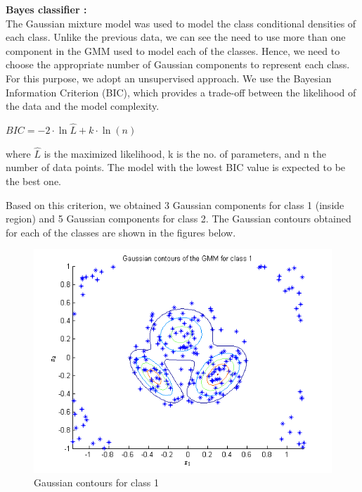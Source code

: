 \documentclass{article}
\begin{document}
\begin{flushleft}

\textbf{Bayes classifier :}  \\[10pt]
The Gaussian mixture model was used to model the class conditional densities of each class. Unlike the previous data, we can see the need to use more than one component in the GMM used to model each of the classes. Hence, we need to choose the appropriate number of Gaussian components to represent each class.
\\[10pt]

For this purpose, we adopt an unsupervised approach. We use the Bayesian Information Criterion (BIC), which provides a trade-off between the likelihood of the data and the model complexity.

 $BIC = -2 \cdot \ln\hat L + k \cdot \ln(n)$  


where $\hat L$ is the maximized likelihood, k is the no. of parameters, and n the number of data points. The model with the lowest BIC value is expected to be the best one.


Based on this criterion, we obtained 3 Gaussian components for class 1 (inside region) and 5 Gaussian components for class 2. The Gaussian contours obtained for each of the classes are shown in the figures below.



\end{flushleft}


\begin{figure}[H]
\centering
\includegraphics[width=\linewidth]{Classification/nonlinearlySeparable/gmm_1.png}
\caption{Gaussian contours for class 1}
\end{figure}
\end{document}
